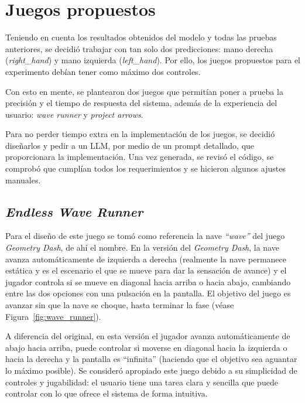 \chapter{Juegos propuestos}
\label{cap:juegosPropuestos}

Teniendo en cuenta los resultados obtenidos del modelo y todas las pruebas anteriores, se decidió trabajar con tan solo dos predicciones: mano derecha (\textit{right\_hand}) y mano izquierda (\textit{left\_hand}). Por ello, los juegos propuestos para el experimento debían tener como máximo dos controles.

Con esto en mente, se plantearon dos juegos que permitían poner a prueba la precisión y el tiempo de respuesta del sistema, además de la experiencia del usuario: \textit{wave runner} y \textit{project arrows}.

Para no perder tiempo extra en la implementación de los juegos, se decidió diseñarlos y pedir a un LLM, por medio de un prompt detallado, que proporcionara la implementación. Una vez generada, se revisó el código, se comprobó que cumplían todos los requerimientos y se hicieron algunos ajustes manuales.

\section{\textit{Endless Wave Runner}}
\label{sec:endless_wave_runner}

Para el diseño de este juego se tomó como referencia la nave \textit{``wave''} del juego \textit{Geometry Dash}, de ahí el nombre. En la versión del \textit{Geometry Dash}, la nave avanza automáticamente de izquierda a derecha (realmente la nave permanece estática y es el escenario el que se mueve para dar la sensación de avance) y el jugador controla si se mueve en diagonal hacia arriba o hacia abajo, cambiando entre las dos opciones con una pulsación en la pantalla. El objetivo del juego es avanzar sin que la nave se choque, hasta terminar la fase (véase Figura~\ref{fig:wave_runner}). 

A diferencia del original, en esta versión el jugador avanza automáticamente de abajo hacia arriba, puede controlar si moverse en diagonal hacia la izquierda o hacia la derecha y la pantalla es ``infinita'' (haciendo que el objetivo sea aguantar lo máximo posible). Se consideró apropiado este juego debido a su simplicidad de controles y jugabilidad: el usuario tiene una tarea clara y sencilla que puede controlar con lo que ofrece el sistema de forma intuitiva. 

